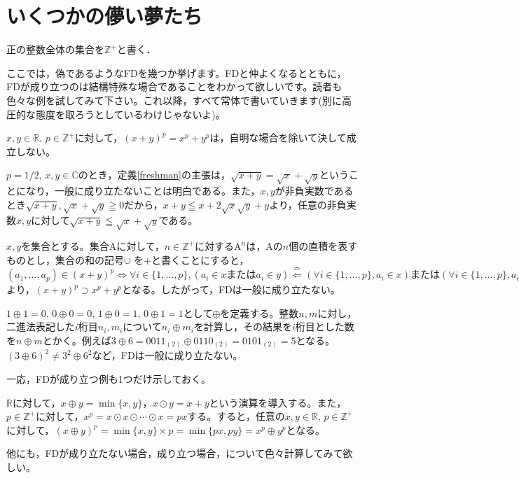 \section{いくつかの儚い夢たち}
\begin{dfn}[数の集合]
    正の整数全体の集合を$\mathbb{Z^{+}}$と書く．
\end{dfn}

ここでは，偽であるような\textsf{FD}を幾つか挙げます。\textsf{FD}と仲よくなるとともに，\textsf{FD}が成り立つのは結構特殊な場合であることをわかって欲しいです。読者も色々な例を試してみて下さい。これ以降，すべて常体で書いていきます(別に高圧的な態度を取ろうとしているわけじゃないよ)。

\begin{mybox}[展開公式]
    $x,y \in \mathbb{R},\, p \in \mathbb{Z^{+}}$に対して，$(x + y)^p = x^p + y^p$は，自明な場合を除いて決して成立しない。
\end{mybox}

\begin{mybox}[平方根]
    $p = 1/2, \, x,y \in \mathbb{C}$のとき，定義\ref{freshman}の主張は，$\sqrt{x+y} = \sqrt{x} + \sqrt{y}$ということになり，一般に成り立たないことは明白である。また，$x,y$が非負実数であるとき$\sqrt{x+y},\sqrt{x}+\sqrt{y}\geqq 0$だから，$x+y\leqq x+2\sqrt{x}\sqrt{y}+y$より，任意の非負実数$x,y$に対して$\sqrt{x+y}\leqq\sqrt{x}+\sqrt{y}$である。
\end{mybox}

\begin{mybox}[集合の直積]
    $x,y$を集合とする。集合$\mathrm{A}$に対して，$n \in \mathbb{Z^{+}}$に対する$\mathrm{A}^n$は，$\mathrm{A}$の$n$個の直積を表すものとし，集合の和の記号$\cup$ を+と書くことにすると，$(a_1,\ldots,a_p)\in(x+y)^p\Leftrightarrow\forall i\in\{1,\ldots,p\},(a_i\in x\text{または} a_i\in y)\overset{\not\Rightarrow}{\Leftarrow}(\forall i\in\{1,\ldots,p\}, a_i\in x)\text{または}(\forall i\in\{1,\ldots,p\}, a_i\in y)\Leftrightarrow (a_1,\ldots,a_p)\in x^p+y^p$より，$(x+y)^p\supset x^p+y^p$となる。したがって，\textsf{FD}は一般に成り立たない。
\end{mybox}

\begin{mybox}[排他的論理和]
    $1\oplus1=0,\,0\oplus0=0,\,1\oplus0=1,\,0\oplus1=1$として$\oplus$を定義する。整数$n,m$に対し，二進法表記した$i$桁目$n_i,m_i$について$n_i\oplus m_i$を計算し，その結果を$i$桁目とした数を$n\oplus m$とかく。例えば$3\oplus6=0011_{(2)}\oplus0110_{(2)}=0101_{(2)}=5$となる。$(3\oplus6)^2\ne 3^2\oplus6^2$など，\textsf{FD}は一般に成り立たない。
\end{mybox}

一応，\textsf{FD}が成り立つ例も1つだけ示しておく。

\begin{mybox}
    $\mathbb{R}$に対して，$x\oplus y=\min\{x, y\}$，$x\odot y=x+y$という演算を導入する。また，$p\in\mathbb{Z^+}$に対して，$x^p=x\odot x\odot\cdots\odot x=px$する。すると，任意の$x,y\in\mathbb{R},\, p\in\mathbb{Z}^+$に対して，$(x\oplus y)^p=\min\{x,y\}\times p=\min\{px, py\}=x^p\oplus y^p$となる。
\end{mybox}

他にも，\textsf{FD}が成り立たない場合，成り立つ場合，について色々計算してみて欲しい。


